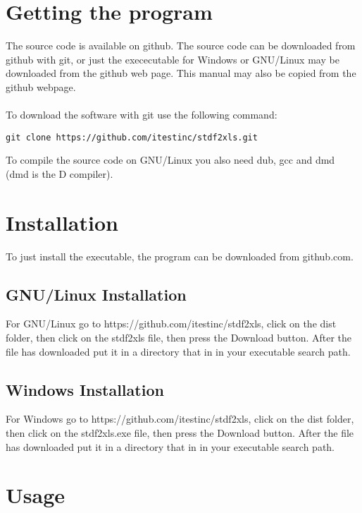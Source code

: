 \documentclass[letterpaper]{article}
\begin{document}
\section{Getting the program}

The source code is available on github. The source code can be downloaded
from github with git, or just the exececutable for Windows or GNU/Linux
may be downloaded from the github web page.  This manual may also be copied
from the github webpage.\\
\\
To download the software with git use the following command:
\begin{verbatim}
git clone https://github.com/itestinc/stdf2xls.git
\end{verbatim}

\noindent To compile the source code on GNU/Linux you also need dub, gcc and dmd (dmd is the D compiler).

\section{Installation}

To just install the executable, the program can be downloaded from github.com.

\subsection{GNU/Linux Installation}

For GNU/Linux go to https://github.com/itestinc/stdf2xls, click on the dist folder, then
click on the stdf2xls file, then press the Download button.  After the file has downloaded
put it in a directory that in in your executable search path.

\subsection{Windows Installation}

For Windows go to https://github.com/itestinc/stdf2xls, click on the dist folder, then 
click on the stdf2xls.exe file, then press the Download button.  After the file has downloaded
put it in a directory that in in your executable search path.

\section{Usage}
\end{document}

